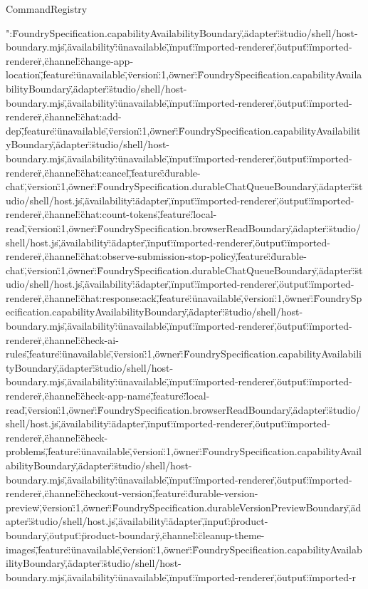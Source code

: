 \begin{lexlean}{CommandRegistry}
\begin{semanticmodule}
{":\"FoundrySpecification.capabilityAvailabilityBoundary\",\"adapter\":\"studio/shell/host-boundary.mjs\",\"availability\":\"unavailable\",\"input\":\"imported-renderer\",\"output\":\"imported-renderer\"},{\"channel\":\"change-app-location\",\"feature\":\"unavailable\",\"version\":1,\"owner\":\"FoundrySpecification.capabilityAvailabilityBoundary\",\"adapter\":\"studio/shell/host-boundary.mjs\",\"availability\":\"unavailable\",\"input\":\"imported-renderer\",\"output\":\"imported-renderer\"},{\"channel\":\"chat:add-dep\",\"feature\":\"unavailable\",\"version\":1,\"owner\":\"FoundrySpecification.capabilityAvailabilityBoundary\",\"adapter\":\"studio/shell/host-boundary.mjs\",\"availability\":\"unavailable\",\"input\":\"imported-renderer\",\"output\":\"imported-renderer\"},{\"channel\":\"chat:cancel\",\"feature\":\"durable-chat\",\"version\":1,\"owner\":\"FoundrySpecification.durableChatQueueBoundary\",\"adapter\":\"studio/shell/host.js\",\"availability\":\"adapter\",\"input\":\"imported-renderer\",\"output\":\"imported-renderer\"},{\"channel\":\"chat:count-tokens\",\"feature\":\"local-read\",\"version\":1,\"owner\":\"FoundrySpecification.browserReadBoundary\",\"adapter\":\"studio/shell/host.js\",\"availability\":\"adapter\",\"input\":\"imported-renderer\",\"output\":\"imported-renderer\"},{\"channel\":\"chat:observe-submission-stop-policy\",\"feature\":\"durable-chat\",\"version\":1,\"owner\":\"FoundrySpecification.durableChatQueueBoundary\",\"adapter\":\"studio/shell/host.js\",\"availability\":\"adapter\",\"input\":\"imported-renderer\",\"output\":\"imported-renderer\"},{\"channel\":\"chat:response:ack\",\"feature\":\"unavailable\",\"version\":1,\"owner\":\"FoundrySpecification.capabilityAvailabilityBoundary\",\"adapter\":\"studio/shell/host-boundary.mjs\",\"availability\":\"unavailable\",\"input\":\"imported-renderer\",\"output\":\"imported-renderer\"},{\"channel\":\"check-ai-rules\",\"feature\":\"unavailable\",\"version\":1,\"owner\":\"FoundrySpecification.capabilityAvailabilityBoundary\",\"adapter\":\"studio/shell/host-boundary.mjs\",\"availability\":\"unavailable\",\"input\":\"imported-renderer\",\"output\":\"imported-renderer\"},{\"channel\":\"check-app-name\",\"feature\":\"local-read\",\"version\":1,\"owner\":\"FoundrySpecification.browserReadBoundary\",\"adapter\":\"studio/shell/host.js\",\"availability\":\"adapter\",\"input\":\"imported-renderer\",\"output\":\"imported-renderer\"},{\"channel\":\"check-problems\",\"feature\":\"unavailable\",\"version\":1,\"owner\":\"FoundrySpecification.capabilityAvailabilityBoundary\",\"adapter\":\"studio/shell/host-boundary.mjs\",\"availability\":\"unavailable\",\"input\":\"imported-renderer\",\"output\":\"imported-renderer\"},{\"channel\":\"checkout-version\",\"feature\":\"durable-version-preview\",\"version\":1,\"owner\":\"FoundrySpecification.durableVersionPreviewBoundary\",\"adapter\":\"studio/shell/host.js\",\"availability\":\"adapter\",\"input\":\"product-boundary\",\"output\":\"product-boundary\"},{\"channel\":\"cleanup-theme-images\",\"feature\":\"unavailable\",\"version\":1,\"owner\":\"FoundrySpecification.capabilityAvailabilityBoundary\",\"adapter\":\"studio/shell/host-boundary.mjs\",\"availability\":\"unavailable\",\"input\":\"imported-renderer\",\"output\":\"imported-r}
\end{semanticmodule}
\end{lexlean}
